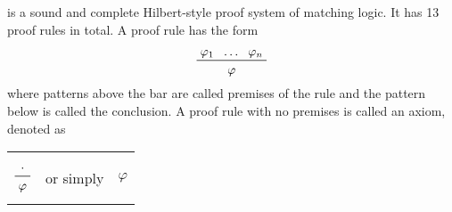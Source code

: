 \documentclass{amsart}
\begin{document}
is a sound and complete Hilbert-style proof system of matching logic.
It has 13 proof rules in total.
A proof rule has the form
$$
\begin{prftree}
{\varphi_1}
{\dots}
{\varphi_n}
{\varphi}
\end{prftree}
$$
where patterns above the bar are called premises of the rule
and the pattern below is called the conclusion.
A proof rule with no premises is called an axiom,
denoted as
\begin{center}
\begin{tabular}{ccc}
$$
\begin{prftree}
{\cdot}
{\varphi}
\end{prftree}
$$
&
or simply
&
$\varphi$
\end{tabular}
\end{center}
\end{document}

